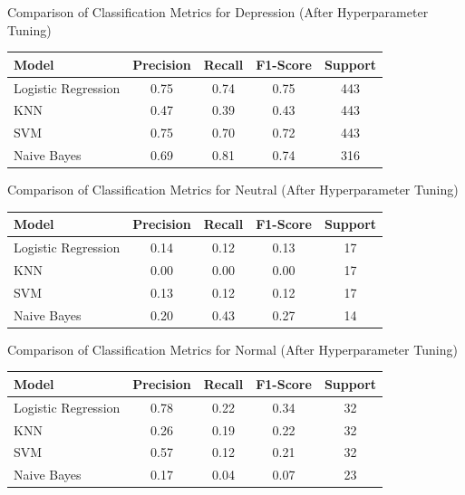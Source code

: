 \begin{center}
\vspace{0.25in}

Comparison of Classification Metrics for Depression (After Hyperparameter Tuning)
\begin{tabular}{|l|c|c|c|c|}
\hline
\textbf{Model} & \textbf{Precision} & \textbf{Recall} & \textbf{F1-Score} & \textbf{Support} \\ \hline
Logistic Regression & 0.75 & 0.74 & 0.75 & 443 \\ \hline
KNN                & 0.47 & 0.39 & 0.43 & 443 \\ \hline
SVM                & 0.75 & 0.70 & 0.72 & 443 \\ \hline
Naive Bayes        & 0.69 & 0.81 & 0.74 & 316 \\ \hline
\end{tabular}

\vspace{0.25in}

Comparison of Classification Metrics for Neutral (After Hyperparameter Tuning)
\begin{tabular}{|l|c|c|c|c|}
\hline
\textbf{Model} & \textbf{Precision} & \textbf{Recall} & \textbf{F1-Score} & \textbf{Support} \\ \hline
Logistic Regression & 0.14 & 0.12 & 0.13 & 17 \\ \hline
KNN                & 0.00 & 0.00 & 0.00 & 17 \\ \hline
SVM                & 0.13 & 0.12 & 0.12 & 17 \\ \hline
Naive Bayes        & 0.20 & 0.43 & 0.27 & 14 \\ \hline
\end{tabular}

\vspace{0.25in}
Comparison of Classification Metrics for Normal (After Hyperparameter Tuning)
\begin{tabular}{|l|c|c|c|c|}
\hline
\textbf{Model} & \textbf{Precision} & \textbf{Recall} & \textbf{F1-Score} & \textbf{Support} \\ \hline
Logistic Regression & 0.78 & 0.22 & 0.34 & 32 \\ \hline
KNN                & 0.26 & 0.19 & 0.22 & 32 \\ \hline
SVM                & 0.57 & 0.12 & 0.21 & 32 \\ \hline
Naive Bayes        & 0.17 & 0.04 & 0.07 & 23 \\ \hline
\end{tabular}


\end{center}
